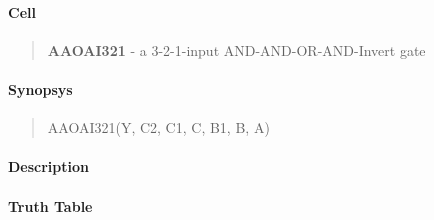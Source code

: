 \label{AAOAI321}
\paragraph{Cell}
\begin{quote}
    \textbf{AAOAI321} - a 3-2-1-input AND-AND-OR-AND-Invert gate
\end{quote}

\paragraph{Synopsys}
\begin{quote}
    AAOAI321(Y, C2, C1, C, B1, B, A)
\end{quote}

\paragraph{Description}

%

\paragraph{Truth Table}
%

